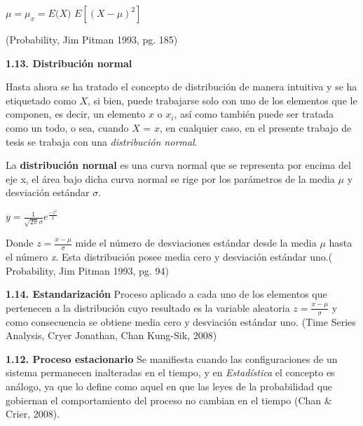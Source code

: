 \begin{center}
\hspace{3cm}$\mu = \mu_x = \textit{E(X)}$
\newline
$E[(X - \mu)^2]$
\end{center}
(Probability, Jim Pitman 1993, pg. 185)
\newpage

{
\noindent
\Large  \textbf{1.13. Distribución normal} 
}

Hasta ahora se ha tratado el concepto de distribución de manera intuitiva y  se ha etiquetado como $\textit{X}$, si bien, puede trabajarse solo con uno de los elementos que le componen, es decir, un elemento $\textit{x}$ o $\textit{x}_i$, así como también puede ser tratada como un todo, o sea, cuando $\textit{X = x}$, en cualquier caso, en el presente trabajo de tesis se trabaja con una \textit{distribución normal}.

La \textbf{distribución normal} es una curva normal que se representa por encima del eje x, el área bajo dicha curva normal se rige por los parámetros de la media $\mu$ y desviación estándar $\sigma$.

\begin{center}
$y = \frac{1}{\sqrt{2\pi}\sigma} e^{\frac{-z^2}{2}}$
\end{center} 

Donde $z = \frac{x - \mu}{\sigma}$ mide el número de desviaciones estándar desde la media $\mu$ hasta el número \textit{x}. Esta distribución posee media cero y desviación estándar uno.( Probability, Jim Pitman 1993, pg. 94)
\newline

{
\noindent
\Large  \textbf{1.14. Estandarización} 
} 
\newline
Proceso aplicado a cada uno de los elementos que pertenecen a la distribución cuyo resultado es la variable aleatoria $z = \frac{x - \mu}{\sigma}$ y como consecuencia se obtiene media cero y desviación estándar uno. (Time Series Analysis, Cryer Jonathan, Chan Kung-Sik, 2008)
\newline

{
\noindent
\Large  \textbf{1.12. Proceso estacionario} 
}
\newline
Se manifiesta cuando las configuraciones de un sistema permanecen inalteradas en el tiempo, y en \textit{Estadística} el concepto es análogo, ya que lo define como \guillemotleft aquel en que las leyes de la probabilidad que gobiernan el comportamiento del proceso no cambian en el tiempo \guillemotright (Chan \& Crier, 2008).
\newpage



